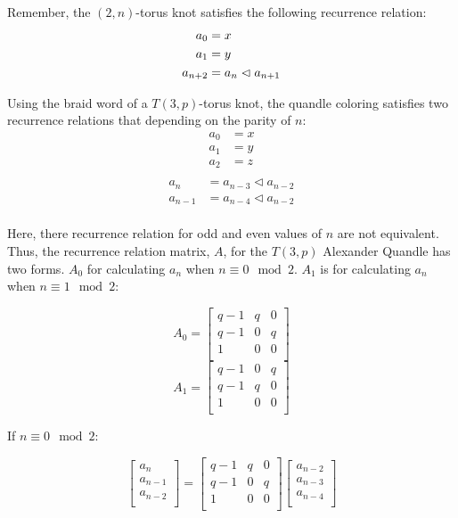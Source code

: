 \documentclass[paper.tex]{subfiles}
\begin{document}
Remember, the $(2,n)$-torus knot satisfies the following recurrence relation:
\begin{align*}
	a_0 &= x \\
	a_1 &= y \\
	a_{n+2} &= a_{n} \vartriangleleft a_{n+1} \\
\end{align*}

Using the braid word of a $T(3,p)$-torus knot, the quandle coloring satisfies two recurrence relations that depending on the parity of $n$:
\begin{align*}
	a_0 &= x \\
	a_1 &= y \\
	a_2 &= z \\
\end{align*}
\begin{align*}
	a_{n} &= a_{n-3} \triangleleft a_{n-2} \\
	a_{n-1} &= a_{n-4} \triangleleft a_{n-2} \\
\end{align*}

Here, there recurrence relation for odd and even values of $n$ are not equivalent. Thus, the recurrence relation matrix, $A$, for the $T(3, p)$ Alexander Quandle has two forms. $A_{0}$ for calculating $a_{n}$ when $n \equiv 0 \mod 2$. $A_{1}$ is for calculating $a_{n}$ when $n \equiv 1 \mod 2$:

\[ A_{0} =
\left[ \begin{array}{ccc}
q-1 & q & 0 \\
q-1 & 0 & q \\
1 & 0 & 0 \\
\end{array} \right]
\]
\[ A_{1} =
\left[ \begin{array}{ccc}
q-1 & 0 & q \\
q-1 & q & 0 \\
1 & 0 & 0 \\
\end{array} \right]
\]

If $n \equiv 0 \mod 2$:

\[
\left[ \begin{array}{ccc}
a_{n} \\
a_{n-1} \\
a_{n-2} \\
\end{array} \right]
=
\left[ \begin{array}{ccc}
q-1 & q & 0 \\
q-1 & 0 & q \\
1 & 0 & 0 \\
\end{array} \right]
\left[ \begin{array}{ccc}
a_{n-2} \\
a_{n-3} \\
a_{n-4} \\
\end{array} \right]
\]
\end{document}

